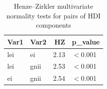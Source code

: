 \begin{table}[ht]
\centering
\begin{tabular}{llrl}
  \toprule
Var1 & Var2 & HZ & p\_value \\
  \midrule
lei & ei & 2.13 & $<$0.001 \\
  lei & gnii & 2.53 & $<$0.001 \\
  ei & gnii & 2.54 & $<$0.001 \\
   \bottomrule
\end{tabular}
\caption{Henze--Zirkler multivariate normality tests for pairs of HDI components}
\label{tab:hz_test}
\end{table}
